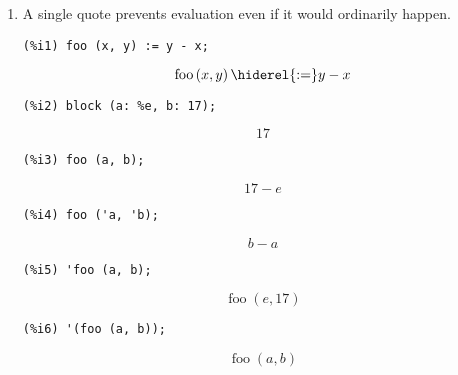 \documentclass[12pt,leqno]{article}
\begin{document}
\begin{enumerate}
\item A single quote prevents evaluation even if it would ordinarily happen.
\begin{verbatim}
(%i1) foo (x, y) := y - x;
\end{verbatim}
\begin{dmath}[number={\(\mathop{\mathrm{\%o}_{1}}\)}]
\mathop{\mathrm{foo}}\left(x, y\right) \hiderel{:=} y-x
\end{dmath}
\begin{verbatim}
(%i2) block (a: %e, b: 17);
\end{verbatim}
\begin{dmath}[number={\(\mathop{\mathrm{\%o}_{2}}\)}]
17
\end{dmath}
\begin{verbatim}
(%i3) foo (a, b);
\end{verbatim}
\begin{dmath}[number={\(\mathop{\mathrm{\%o}_{3}}\)}]
17-e
\end{dmath}
\begin{verbatim}
(%i4) foo ('a, 'b);
\end{verbatim}
\begin{dmath}[number={\(\mathop{\mathrm{\%o}_{4}}\)}]
b-a
\end{dmath}
\begin{verbatim}
(%i5) 'foo (a, b);
\end{verbatim}
\begin{dmath}[number={\(\mathop{\mathrm{\%o}_{5}}\)}]
\mathop{\mathrm{foo}}\left(e, 17\right)
\end{dmath}
\begin{verbatim}
(%i6) '(foo (a, b));
\end{verbatim}
\begin{dmath}[number={\(\mathop{\mathrm{\%o}_{6}}\)}]
\mathop{\mathrm{foo}}\left(a, b\right)
\end{dmath}



\end{enumerate}
\end{document}
